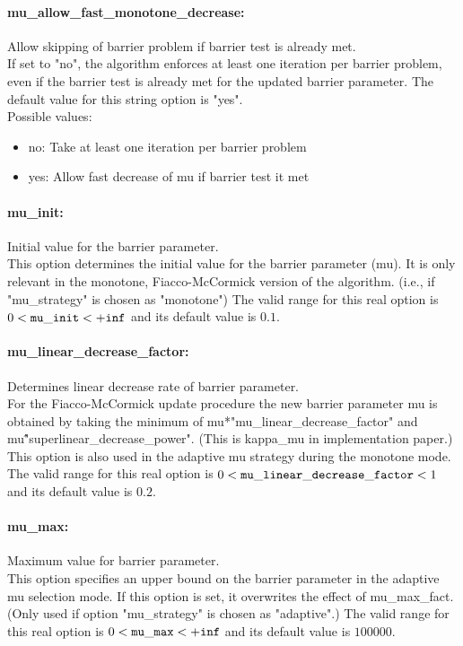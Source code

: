 \paragraph{mu\_allow\_fast\_monotone\_decrease:}\label{opt:mu_allow_fast_monotone_decrease} Allow skipping of barrier problem if barrier test is already met. \\
 If set to "no", the algorithm enforces at least one iteration per barrier problem, even if the barrier test is already met for the updated barrier parameter. The default value for this string option is "yes".
\\ 
Possible values:
\begin{itemize}
   \item no: Take at least one iteration per barrier problem
   \item yes: Allow fast decrease of mu if barrier test it met
\end{itemize}

\paragraph{mu\_init:}\label{opt:mu_init} Initial value for the barrier parameter. \\
 This option determines the initial value for the barrier parameter (mu).  It is only relevant in the monotone, Fiacco-McCormick version of the algorithm. (i.e., if "mu\_strategy" is chosen as "monotone") The valid range for this real option is 
$0 <  {\tt mu\_init } <  {\tt +inf}$
and its default value is $0.1$.


\paragraph{mu\_linear\_decrease\_factor:}\label{opt:mu_linear_decrease_factor} Determines linear decrease rate of barrier parameter. \\
 For the Fiacco-McCormick update procedure the new barrier parameter mu is obtained by taking the minimum of mu*"mu\_linear\_decrease\_factor" and mu\^"superlinear\_decrease\_power".  (This is kappa\_mu in implementation paper.) This option is also used in the adaptive mu strategy during the monotone mode. The valid range for this real option is 
$0 <  {\tt mu\_linear\_decrease\_factor } <  1$
and its default value is $0.2$.


\paragraph{mu\_max:}\label{opt:mu_max} Maximum value for barrier parameter. \\
 This option specifies an upper bound on the barrier parameter in the adaptive mu selection mode.  If this option is set, it overwrites the effect of mu\_max\_fact. (Only used if option "mu\_strategy" is chosen as "adaptive".) The valid range for this real option is 
$0 <  {\tt mu\_max } <  {\tt +inf}$
and its default value is $100000$.


